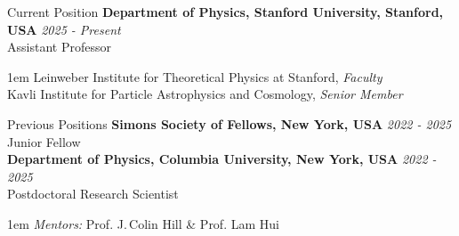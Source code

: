 \documentclass{resume} %
\begin{document}

\begin{rSection}{Current Position}
{\bf Department of Physics, Stanford University, Stanford, USA} \hfill {\em 2025 - Present} \\
Assistant Professor
\begin{addmargin}[1em]{1em}
Leinweber Institute for Theoretical Physics at Stanford, \textit{Faculty}\\
Kavli Institute for Particle Astrophysics and Cosmology, \textit{Senior Member}
\end{addmargin}
\end{rSection}

\begin{rSection}{Previous Positions}
{\bf Simons Society of Fellows, New York, USA} \hfill {\em 2022 - 2025} \\
Junior Fellow%
\\\newline
{\bf Department of Physics, Columbia University, New York, USA} \hfill {\em 2022 - 2025} \\
Postdoctoral Research Scientist
\begin{addmargin}[1em]{1em}
\textit{Mentors:} Prof.\,\,J.\,Colin Hill \& Prof.\,\,Lam Hui 
\end{addmargin}
\end{rSection}
\end{document}
